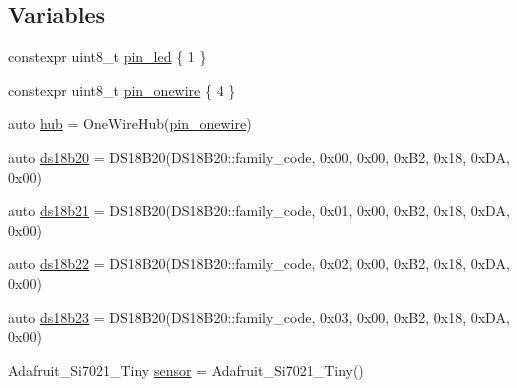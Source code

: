 \subsection*{Variables}
\begin{DoxyCompactItemize}
\item 
constexpr uint8\-\_\-t \hyperlink{Tiny__OWSlave__OWH__DS18B20__thermo-hygrometer_8ino_add5a7eb759d22b21f8875663ed2c1528}{pin\-\_\-led} \{ 1 \}
\item 
constexpr uint8\-\_\-t \hyperlink{Tiny__OWSlave__OWH__DS18B20__thermo-hygrometer_8ino_ad4f51a015485d98cc3a8a79f41a81027}{pin\-\_\-onewire} \{ 4 \}
\item 
auto \hyperlink{Tiny__OWSlave__OWH__DS18B20__thermo-hygrometer_8ino_a3beb275f1ae5db0a79499403dd2fbff8}{hub} = One\-Wire\-Hub(\hyperlink{OWH__DS2438__battMon__Test_8ino_ad4f51a015485d98cc3a8a79f41a81027}{pin\-\_\-onewire})
\item 
auto \hyperlink{Tiny__OWSlave__OWH__DS18B20__thermo-hygrometer_8ino_ae38016b79711fa4f32a36debda7ae0f2}{ds18b20} = D\-S18\-B20(D\-S18\-B20\-::family\-\_\-code, 0x00, 0x00, 0x\-B2, 0x18, 0x\-D\-A, 0x00)
\item 
auto \hyperlink{Tiny__OWSlave__OWH__DS18B20__thermo-hygrometer_8ino_a1f72447c574df0bfefa4743f352b8dcc}{ds18b21} = D\-S18\-B20(D\-S18\-B20\-::family\-\_\-code, 0x01, 0x00, 0x\-B2, 0x18, 0x\-D\-A, 0x00)
\item 
auto \hyperlink{Tiny__OWSlave__OWH__DS18B20__thermo-hygrometer_8ino_a7462aab956e92631bce324250cfc621f}{ds18b22} = D\-S18\-B20(D\-S18\-B20\-::family\-\_\-code, 0x02, 0x00, 0x\-B2, 0x18, 0x\-D\-A, 0x00)
\item 
auto \hyperlink{Tiny__OWSlave__OWH__DS18B20__thermo-hygrometer_8ino_a611cdf853a345f5e3f5c4f854febac67}{ds18b23} = D\-S18\-B20(D\-S18\-B20\-::family\-\_\-code, 0x03, 0x00, 0x\-B2, 0x18, 0x\-D\-A, 0x00)
\item 
Adafruit\-\_\-\-Si7021\-\_\-\-Tiny \hyperlink{Tiny__OWSlave__OWH__DS18B20__thermo-hygrometer_8ino_abdb2aa4e7ca4f99842081342ca9d8830}{sensor} = Adafruit\-\_\-\-Si7021\-\_\-\-Tiny()
\end{DoxyCompactItemize}


